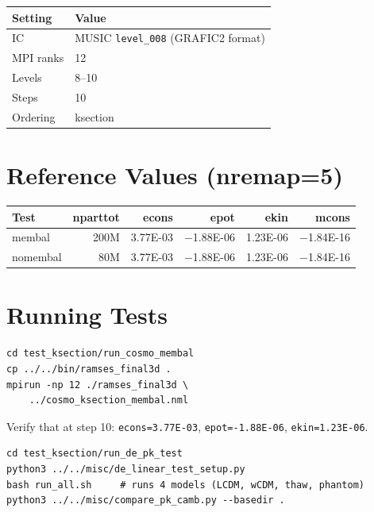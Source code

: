 \documentclass[11pt,fleqn]{book}
\begin{document}
\begin{center}
\begin{tabular}{ll}
\toprule
\textbf{Setting} & \textbf{Value} \\
\midrule
IC & MUSIC \texttt{level\_008} (GRAFIC2 format) \\
MPI ranks & 12 \\
Levels & 8--10 \\
Steps & 10 \\
Ordering & ksection \\
\bottomrule
\end{tabular}
\end{center}

\section{Reference Values (nremap=5)}

\begin{center}
\begin{tabular}{lrrrrr}
\toprule
\textbf{Test} & \textbf{nparttot} & \textbf{econs} & \textbf{epot} & \textbf{ekin} & \textbf{mcons} \\
\midrule
membal & 200M & 3.77E-03 & $-$1.88E-06 & 1.23E-06 & $-$1.84E-16 \\
nomembal & 80M & 3.77E-03 & $-$1.88E-06 & 1.23E-06 & $-$1.84E-16 \\
\bottomrule
\end{tabular}
\end{center}

\section{Running Tests}

\begin{codebox}
\begin{lstlisting}[style=bash,numbers=none]
cd test_ksection/run_cosmo_membal
cp ../../bin/ramses_final3d .
mpirun -np 12 ./ramses_final3d \
    ../cosmo_ksection_membal.nml
\end{lstlisting}
\end{codebox}

Verify that at step 10: \texttt{econs=3.77E-03}, \texttt{epot=-1.88E-06}, \texttt{ekin=1.23E-06}.

\begin{codebox}
\begin{lstlisting}[style=bash,numbers=none]
cd test_ksection/run_de_pk_test
python3 ../../misc/de_linear_test_setup.py
bash run_all.sh     # runs 4 models (LCDM, wCDM, thaw, phantom)
python3 ../../misc/compare_pk_camb.py --basedir .
\end{lstlisting}
\end{codebox}
\end{document}
